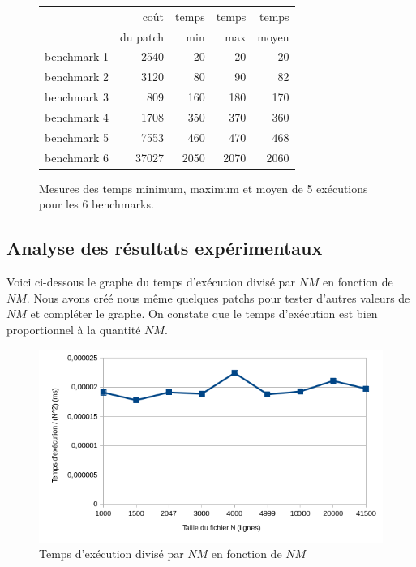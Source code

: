 \documentclass[a4paper, 10pt, french]{article}
\begin{document}
    \begin{figure}[h!]
      \begin{center}
        \begin{tabular}{|l||r||r|r|r||}
          \hline
          \hline
            & coût         & temps     & temps   & temps \\
            & du patch     & min       & max     & moyen \\
          \hline
          \hline
            benchmark 1 & 2540 & 20 & 20 & 20 \\
          \hline
            benchmark 2 & 3120 & 80 & 90 & 82 \\
          \hline
            benchmark 3 & 809 & 160 & 180 & 170 \\
          \hline
            benchmark 4 & 1708 & 350 & 370 & 360 \\
          \hline
            benchmark 5 & 7553 & 460 & 470 & 468 \\
          \hline
            benchmark 6 & 37027 & 2050 & 2070 & 2060 \\
          \hline
          \hline
        \end{tabular}
        \caption{Mesures des temps minimum, maximum et moyen de 5 exécutions pour les 6 benchmarks.}
        \label{table-temps}
      \end{center}
    \end{figure}

\newpage
\subsection{Analyse des résultats expérimentaux}

Voici ci-dessous le graphe du temps d'exécution divisé par $NM$ en fonction de $NM$.
Nous avons créé nous même quelques patchs pour tester d'autres valeurs de $NM$ et compléter le graphe.
On constate que le temps d'exécution est bien proportionnel à la quantité $NM$.


\begin{figure}[h!]
\begin{center}
\includegraphics[width=12cm]{exec.png}
\caption{Temps d'exécution divisé par $NM$ en fonction de $NM$}
\end{center}
\end{figure}
\end{document}
